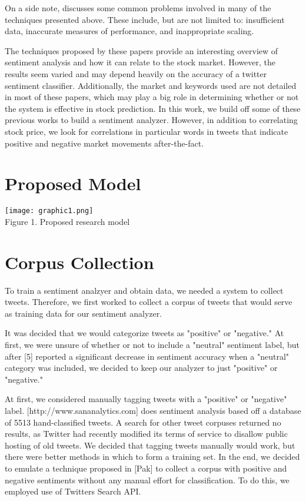 \documentclass[preprint,pre,floats,aps,amsmath,amssymb,12pt]{revtex4}
\begin{document}
On a side note, \cite{Hurwitz} discusses some common problems involved in many of the techniques presented above. These include, but are not limited to: insufficient data, inaccurate measures of performance, and inappropriate scaling. 

The techniques proposed by these papers provide an interesting overview of sentiment analysis and how it can relate to the stock market. However, the results seem varied and may depend heavily on the accuracy of a twitter sentiment classifier. Additionally, the market and keywords used are not detailed in most of these papers, which may play a big role in determining whether or not the system is effective in stock prediction. In this work, we build off some of these previous works to build a sentiment analyzer. However, in addition to correlating stock price, we look for correlations in particular words in tweets that indicate positive and negative market movements after-the-fact. 

\section{Proposed Model}
\label{sec:model}

\texttt{[image: graphic1.png]}\\
Figure 1. Proposed research model

\section{Corpus Collection}
\label{sec:mining}
To train a sentiment analzyer and obtain data, we needed a system to collect tweets. Therefore, we first worked to collect a corpus of tweets that would serve as training data for our sentiment analyzer. 

It was decided that we would categorize tweets as "positive" or "negative." At first, we were unsure of whether or not to include a "neutral" sentiment label, but after [5] reported a significant decrease in sentiment accuracy when a "neutral" category was included, we decided to keep our analyzer to just "positive" or "negative." 

At first, we considered manually tagging tweets with a "positive" or "negative" label. [http://www.sananalytics.com] does sentiment analysis based off a database of 5513 hand-classified tweets. A search for other tweet corpuses returned no results, as Twitter had recently modified its terms of service to disallow public hosting of old tweets. We decided that tagging tweets manually would work, but there were better methods in which to form a training set. In the end, we decided to emulate a technique proposed in [Pak] to collect a corpus with positive and negative sentiments without any manual effort for classification. To do this, we employed use of Twitters Search API. 
\end{document}
